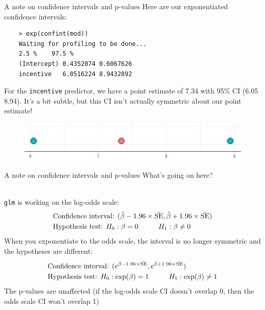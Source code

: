\documentclass[10pt,t]{beamer}
\newcommand\tab[1][1cm]{\hspace*{#1}}
\begin{document}
\begin{frame}[fragile]{A note on confidence intervals and p-values}
	\vspace{-0.7cm}
	Here are our exponentiated confidence intervals:
	
		\begin{verbatim}
	> exp(confint(mod))
	Waiting for profiling to be done...
	2.5 %    97.5 %
	(Intercept) 0.4352074 0.6067626
	incentive   6.0516224 8.9432892
	\end{verbatim}
	For the \texttt{incentive} predictor, we have a point estimate of 7.34 with 95\% CI (6.05 8.94). It's a bit subtle, but this CI isn't actually symmetric about our point estimate!
	\medskip
	
	\begin{figure}
		\centering
		\includegraphics[scale = 0.4]{figs/confint}
	\end{figure}

\end{frame}

\begin{frame}{A note on confidence intervals and p-values}
	What's going on here? 
	\\ ~\
	
	\texttt{glm} is working on the log-odds scale:
	\begin{align*}
		&\text{Confidence interval: }(\hat{\beta} - 1.96 \times \hat{\text{SE}}, \hat{\beta} + 1.96 \times \hat{\text{SE}})\\
		&\text{Hypothesis test: }H_0: \beta = 0 \tab H_1: \beta \neq 0
	\end{align*}
	When you exponentiate to the odds scale, the interval is no longer symmetric and the hypotheses are different:
	\begin{align*}
		&\text{Confidence interval: }(e^{\hat{\beta} - 1.96 \times \hat{\text{SE}}}, e^{\hat{\beta} + 1.96 \times \hat{\text{SE}}})\\
		&\text{Hypothesis test: }H_0: \exp(\beta) = 1 \tab H_1: \exp(\beta) \neq 1
	\end{align*} 
	The p-values are unaffected (if the log-odds scale CI doesn't overlap 0, then the odds scale CI won't overlap 1)
\end{frame}
%
\end{document}
